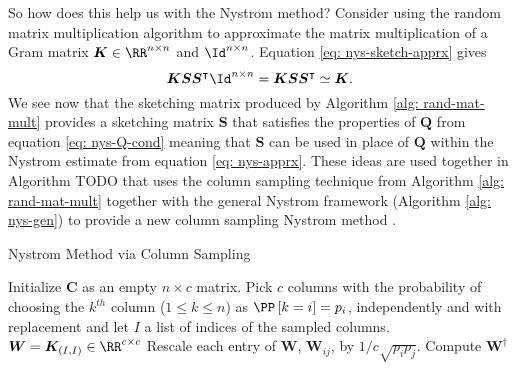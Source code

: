 So how does this help us with the Nystrom method? Consider using the random matrix multiplication algorithm to approximate the matrix multiplication of a Gram matrix $\bm{K} \in \RR^{n \times n}$ and $\Id^{n \times n}$. Equation \ref{eq: nys-sketch-apprx} gives
\begin{equation*}
    \bm{K} \bm{S} \bm{S}^{\intercal} \Id^{n \times n} = \bm{K} \bm{S} \bm{S}^{\intercal} \simeq \bm{K}.
\end{equation*}
We see now that the sketching matrix produced by Algorithm \ref{alg: rand-mat-mult} provides a sketching matrix $\bm{S}$ that satisfies the properties of $\bm{Q}$ from equation \ref{eq: nys-Q-cond} meaning that $\bm{S}$ can be used in place of $\bm{Q}$ within the Nystrom estimate from equation \ref{eq: nys-apprx}. These ideas are used together in Algorithm TODO that uses the column sampling technique from Algorithm \ref{alg: rand-mat-mult} together with the general Nystrom framework (Algorithm \ref{alg: nys-gen}) to provide a new column sampling Nystrom method \cite{JMLR:v6:drineas05a,DBLP:journals/corr/abs-1303-1849}.
{\centering
\begin{minipage}{.85\linewidth}
    \begin{algorithm}[H]
        \caption{Nystrom Method via Column Sampling}
        \label{alg: nys-col-samp}
        \SetAlgoLined
        \DontPrintSemicolon

        \BlankLine
        Initialize $\bm{C}$ as an empty $n \times c$ matrix.\;
        Pick $c$ columns with the probability of choosing the $k^{th}$ column ($1 \leq k \leq n$) as $\PP \left[ k = i \right] = p_i$, independently and with replacement and let $I$ a list of indices of the sampled columns.\;
        $\bm{W} = \bm{K}_{(I,I)} \in \RR^{c \times c}$\;
        Rescale each entry of $\bm{W}$, $\bm{W}_{ij}$, by $1 / c \sqrt{p_i p_j}$.\;
        Compute $\bm{W}^{\dagger}$\;
        \BlankLine
    \end{algorithm}
\end{minipage}
\par}
